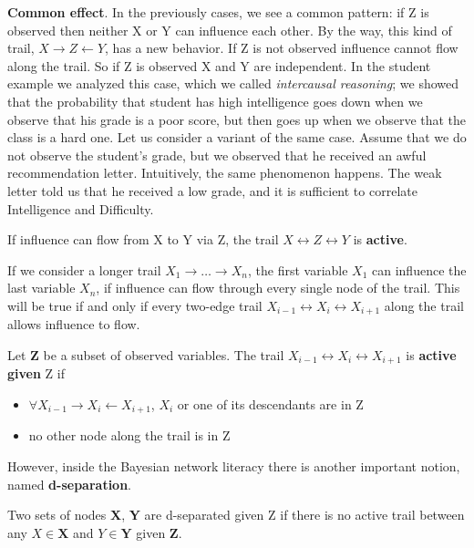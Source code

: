 \textbf{Common effect}. In the previously cases, we see a common pattern: if Z is observed then neither X or Y can influence each other. By the way, this kind of trail, 
$X \rightarrow Z \leftarrow Y$, has a new behavior. If Z is not observed influence cannot flow along the trail. So if Z is observed X and Y are independent. In the student example
we analyzed this case, which we called \textit{intercausal reasoning}; we showed that the probability that student has high intelligence goes down when we observe that his grade is 
a poor score, but then goes up when we observe that the class is a hard one. Let us consider a variant of the same case. Assume that we do not observe the student's grade, but we observed
that he received an awful recommendation letter. Intuitively, the same phenomenon happens. The weak letter told us that he received a low grade, and it is sufficient to 
correlate Intelligence and Difficulty.  
\begin{definition}
    If influence can flow from X to Y via Z, the trail $X \longleftrightarrow Z \longleftrightarrow Y$ is \textbf{active}.
\end{definition}
If we consider a longer trail $X_1 \rightarrow \dots \rightarrow X_n$, the first variable $X_1$ can influence the last variable $X_n$, if influence can flow through every single node of the trail.
This will be true if and only if every two-edge trail $X_{i-1} \longleftrightarrow X_i \longleftrightarrow X_{i+1}$ along the trail allows influence to flow.
\begin{definition}
    Let \textbf{Z} be a subset of observed variables. The trail $X_{i-1} \longleftrightarrow X_i \longleftrightarrow X_{i+1}$ is \textbf{active given} Z if
    \begin{itemize}
        \renewcommand{\labelitemi}{-}
        \item $\forall X_{i-1} \rightarrow X_i \leftarrow X_{i+1}$, $X_i$ or one of its descendants are in Z 
        \item no other node along the trail is in Z
    \end{itemize}
\end{definition}
However, inside the Bayesian network literacy there is another important notion, named \textbf{d-separation}.
\begin{definition}
    Two sets of nodes \textbf{X}, \textbf{Y} are d-separated given Z if there is no active trail between any $X \in \mathbf{X}$ and $Y \in \mathbf{Y}$ given \textbf{Z}.
\end{definition}
